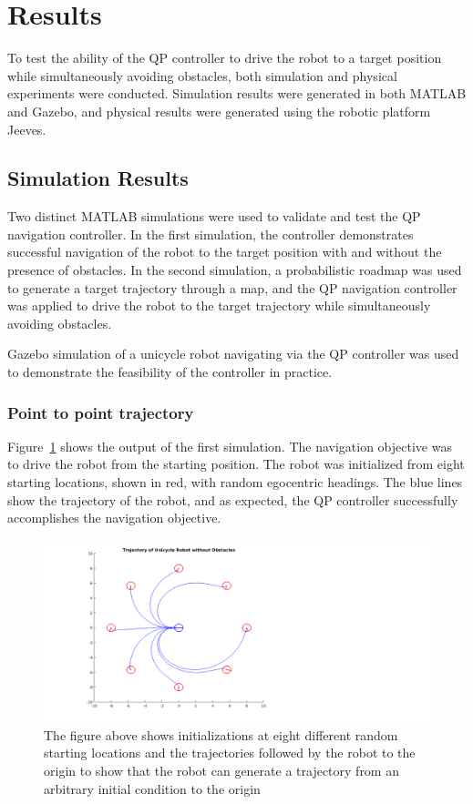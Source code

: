 \documentclass[journal]{IEEEconf}
\begin{document}
\section{Results}


To test the ability of the QP controller to drive the robot to a target position while simultaneously avoiding obstacles, both simulation and physical experiments were conducted. Simulation results were generated in both MATLAB and Gazebo, and physical results were generated using the robotic platform Jeeves. 

\subsection{Simulation Results}
Two distinct MATLAB simulations were used to validate and test the QP navigation controller. In the first simulation, the controller demonstrates successful navigation of the robot to the target position with and without the presence of obstacles. In the second simulation, a probabilistic roadmap was used to generate a target trajectory through a map, and the QP navigation controller was applied to drive the robot to the target trajectory while simultaneously avoiding obstacles. 

Gazebo simulation of a unicycle robot navigating via the QP controller was used to demonstrate the feasibility of the controller in practice.
\subsubsection{Point to point trajectory}
Figure~\ref{fig:octoplotsans} shows the output of the first simulation. The navigation objective was to drive the robot from the starting position. The robot was initialized from eight starting locations, shown in red, with random egocentric headings. The blue lines show the trajectory of the robot, and as expected, the QP controller successfully accomplishes the navigation objective.

\begin{figure}[h!]
\centering
\includegraphics[scale=0.3]{octoPlotCrisisSQR.png} 
\caption{The figure above shows initializations at eight different random starting locations and the trajectories followed by the robot to the origin to show that the robot can generate a trajectory from an arbitrary initial condition to the origin \label{fig:octoplotsans}} 
\end{figure}
\end{document}
